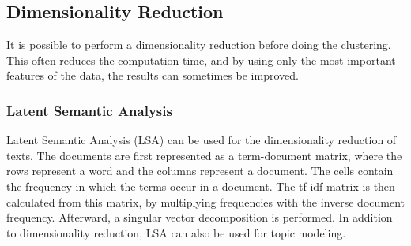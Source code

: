 \subsection{Dimensionality Reduction}
It is possible to perform a dimensionality reduction before doing the clustering.
This often reduces the computation time, and by using only the most important features of the data, the results can sometimes be improved.  

\subsubsection{Latent Semantic Analysis }
Latent Semantic Analysis (LSA) can be used for the dimensionality reduction of texts.
The documents are first represented as a term-document matrix, where the rows represent a word and the columns represent a document.
The cells contain the frequency in which the terms occur in a document.
The tf-idf matrix is then calculated from this matrix, by multiplying frequencies with the inverse document frequency.
Afterward, a singular vector decomposition is performed.\cite{lsa}
In addition to dimensionality reduction, LSA can also be used for topic modeling.